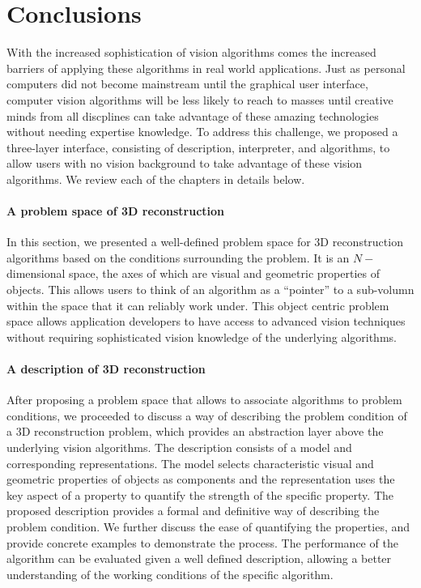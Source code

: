 
\chapter{Conclusions}
\label{ch:conclusion}
With the increased sophistication of vision algorithms comes the increased barriers of applying these algorithms in real world applications. Just as personal computers did not become mainstream until the graphical user interface, computer vision algorithms will be less likely to reach to masses until creative minds from all discplines can take advantage of these amazing technologies without needing expertise knowledge. To address this challenge, we proposed a three-layer interface, consisting of description, interpreter, and algorithms, to allow users with no vision background to take advantage of these vision algorithms. We review each of the chapters in details below.

\subsubsection{A problem space of 3D reconstruction}
In this section, we presented a well-defined problem space for 3D reconstruction algorithms based on the conditions surrounding the problem. It is an $N-$dimensional space, the axes of which are visual and geometric properties of objects. This allows users to think of an algorithm as a ``pointer'' to a sub-volumn within the space that it can reliably work under. This object centric problem space allows application developers to have access to advanced vision techniques without requiring sophisticated vision knowledge of the underlying algorithms.

\subsubsection{A description of 3D reconstruction}
After proposing a problem space that allows to associate algorithms to problem conditions, we proceeded to discuss a way of describing the problem condition of a 3D reconstruction problem, which provides an abstraction layer above the underlying vision algorithms. The description consists of a model and corresponding representations. The model selects characteristic visual and geometric properties of objects as components and the representation uses the key aspect of a property to quantify the strength of the specific property. The proposed description provides a formal and definitive way of describing the problem condition. We further discuss the ease of quantifying the properties, and provide concrete examples to demonstrate the process. The performance of the algorithm can be evaluated given a well defined description, allowing a better understanding of the working conditions of the specific algorithm.

